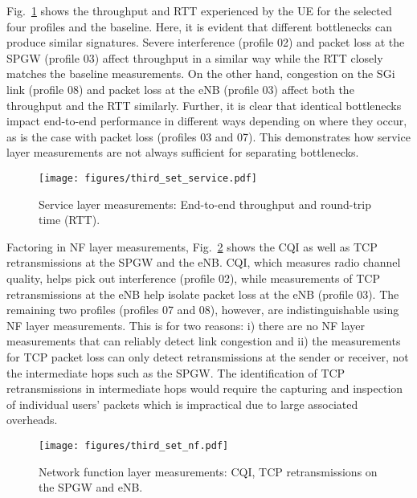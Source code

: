 \documentclass[journal,comsoc]{IEEEtran}
\begin{document}
 Fig.~\ref{fig:third_set_service} shows the throughput and RTT experienced by the UE for the selected four profiles and the baseline. 
Here, it is evident that different bottlenecks can produce similar signatures. Severe interference (profile 02) and packet loss at the SPGW (profile 03) affect throughput in a similar way while the RTT closely matches the baseline measurements. On the other hand, congestion on the SGi link (profile 08) and packet loss at the eNB (profile 03) affect both the throughput and the RTT similarly.
Further, it is clear that identical bottlenecks impact end-to-end performance in different ways depending on where they occur, as is the case with packet loss (profiles 03 and 07).  
This demonstrates how service layer measurements are not always sufficient for separating bottlenecks.

% 
\begin{figure}[t]
	\centering
	\texttt{[image: figures/third\_set\_service.pdf]}
	\vspace{-8mm}
	\caption{Service layer measurements: End-to-end throughput and round-trip time (RTT).}
	\label{fig:third_set_service}
	\vspace{-4mm}
\end{figure}

 Factoring in NF layer measurements, Fig.~\ref{fig:third_set_nf} shows the CQI as well as TCP retransmissions at the SPGW and the eNB. 
CQI, which measures radio channel quality, helps pick out interference (profile 02), while measurements of TCP retransmissions at the eNB help isolate packet loss at the eNB (profile 03).
The remaining two profiles (profiles 07 and 08), however, are indistinguishable using NF layer measurements.
This is for two reasons: i) there are no NF layer measurements that can reliably detect link congestion and ii) the measurements for TCP packet loss can only detect retransmissions at the sender or receiver, not the intermediate hops such as the SPGW. 
The identification of TCP retransmissions in intermediate hops would require the capturing and inspection of individual users' packets which is impractical due to large associated overheads.

% 
\begin{figure}[t]
	\centering
	\texttt{[image: figures/third\_set\_nf.pdf]}
	\vspace{-8mm}
	\caption{Network function layer measurements: CQI, TCP retransmissions on the SPGW and eNB.}
	\label{fig:third_set_nf}
	\vspace{-4mm}
\end{figure}
\end{document}
